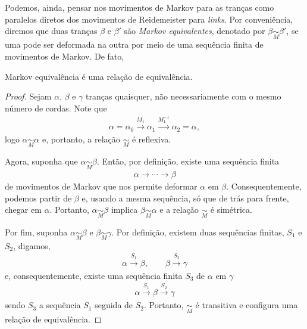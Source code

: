 	Podemos, ainda, pensar nos movimentos de Markov para as tranças como paralelos diretos 
	dos movimentos de Reidemeister para \textit{links}. Por conveniência, diremos que 
	duas tranças $\beta$ e $\beta'$ são \textit{Markov equivalentes}, denotado por
	$\beta\underset{M}{\sim}\beta'$, se uma pode ser deformada na outra por meio de uma 
	sequência finita de movimentos de Markov. De fato,
	\begin{prop}
	\label{Markov equivalencia}
		Markov equivalência é uma relação de equivalência.
	\end{prop} 
	\begin{proof}
		Sejam $\alpha$, $\beta$ e $\gamma$ tranças quaisquer, não necessariamente com o 
		mesmo número de cordas. Note que 
		\begin{align*}
		    \alpha = \alpha_0\overset{M_1}{\to}\alpha_1\overset{M_1^{-1}}{\to}\alpha_2 = \alpha,
		\end{align*}
		logo $\alpha\underset{M}{\sim}\alpha$ e, portanto, a relação $\underset{M}{\sim}$ 
		é reflexiva.
		
		\par\vspace{0.3cm} Agora, suponha que $\alpha\underset{M}{\sim}\beta$. Então, por 
		definição, existe uma sequência finita
		\begin{align*}
		    \alpha\to\cdots\to\beta 
		\end{align*}
		de movimentos de Markov que nos permite deformar $\alpha$ em $\beta$. 
		Consequentemente, podemos partir de $\beta$ e, usando a mesma sequência, 
		só que de trás para frente, chegar em $\alpha$. Portanto, $\alpha\underset{M}{\sim}\beta$ 
		implica $\beta\underset{M}{\sim}\alpha$ e a relação $\underset{M}{\sim}$ é simétrica.
		
		\par\vspace{0.3cm} Por fim, suponha $\alpha\underset{M}{\sim}\beta$ e $\beta\underset{M}{\sim}\gamma$. 
		Por definição, existem duas sequências finitas, $S_1$ e $S_2$, digamos, 
		\begin{align*}
    		\alpha\overset{S_1}{\to}\beta, \qquad \beta\overset{S_2}{\to}\gamma
		\end{align*}
		e, consequentemente, existe uma sequência finita $S_3$ de $\alpha$ em $\gamma$
		\begin{align*}
		    \alpha\overset{S_1}{\to}\beta\overset{S_2}{\to}\gamma 
		\end{align*}
		sendo $S_3$ a sequência $S_1$ seguida de $S_2$. Portanto, $\underset{M}{\sim}$ é 
		transitiva e configura uma relação de equivalência.
	\end{proof}
